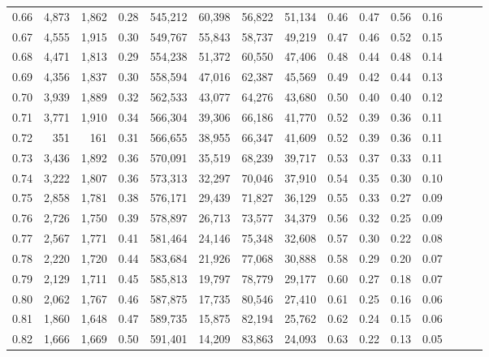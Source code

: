 \begin{tabular}{rrrrrrrrrrrrrrr}
0.66 &   4,873 &  1,862 &  0.28 &  545,212 &   60,398 &   56,822 &   51,134 &  0.46 &  0.47 &  0.56 &      0.16 \\
0.67 &   4,555 &  1,915 &  0.30 &  549,767 &   55,843 &   58,737 &   49,219 &  0.47 &  0.46 &  0.52 &      0.15 \\
0.68 &   4,471 &  1,813 &  0.29 &  554,238 &   51,372 &   60,550 &   47,406 &  0.48 &  0.44 &  0.48 &      0.14 \\
0.69 &   4,356 &  1,837 &  0.30 &  558,594 &   47,016 &   62,387 &   45,569 &  0.49 &  0.42 &  0.44 &      0.13 \\
0.70 &   3,939 &  1,889 &  0.32 &  562,533 &   43,077 &   64,276 &   43,680 &  0.50 &  0.40 &  0.40 &      0.12 \\
0.71 &   3,771 &  1,910 &  0.34 &  566,304 &   39,306 &   66,186 &   41,770 &  0.52 &  0.39 &  0.36 &      0.11 \\
0.72 &     351 &    161 &  0.31 &  566,655 &   38,955 &   66,347 &   41,609 &  0.52 &  0.39 &  0.36 &      0.11 \\
0.73 &   3,436 &  1,892 &  0.36 &  570,091 &   35,519 &   68,239 &   39,717 &  0.53 &  0.37 &  0.33 &      0.11 \\
0.74 &   3,222 &  1,807 &  0.36 &  573,313 &   32,297 &   70,046 &   37,910 &  0.54 &  0.35 &  0.30 &      0.10 \\
0.75 &   2,858 &  1,781 &  0.38 &  576,171 &   29,439 &   71,827 &   36,129 &  0.55 &  0.33 &  0.27 &      0.09 \\
0.76 &   2,726 &  1,750 &  0.39 &  578,897 &   26,713 &   73,577 &   34,379 &  0.56 &  0.32 &  0.25 &      0.09 \\
0.77 &   2,567 &  1,771 &  0.41 &  581,464 &   24,146 &   75,348 &   32,608 &  0.57 &  0.30 &  0.22 &      0.08 \\
0.78 &   2,220 &  1,720 &  0.44 &  583,684 &   21,926 &   77,068 &   30,888 &  0.58 &  0.29 &  0.20 &      0.07 \\
0.79 &   2,129 &  1,711 &  0.45 &  585,813 &   19,797 &   78,779 &   29,177 &  0.60 &  0.27 &  0.18 &      0.07 \\
0.80 &   2,062 &  1,767 &  0.46 &  587,875 &   17,735 &   80,546 &   27,410 &  0.61 &  0.25 &  0.16 &      0.06 \\
0.81 &   1,860 &  1,648 &  0.47 &  589,735 &   15,875 &   82,194 &   25,762 &  0.62 &  0.24 &  0.15 &      0.06 \\
0.82 &   1,666 &  1,669 &  0.50 &  591,401 &   14,209 &   83,863 &   24,093 &  0.63 &  0.22 &  0.13 &      0.05 \\

\end{tabular}
